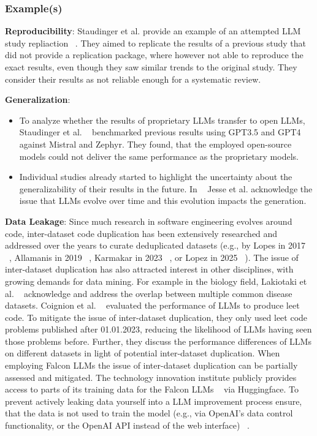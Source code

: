 \begin{itemize}
\subsubsection{Example(s)}
\textbf{Reproducibility}:
Staudinger et al. provide an example of an attempted LLM study repliaction ~\cite{DBLP:conf/sigir-ap/StaudingerKPLH24}. They aimed to replicate the results of a previous study that did not provide a replication package, where however not able to reproduce the exact results, even though they saw similar trends to the original study. They consider their results as not reliable enough for a systematic review.

\textbf{Generalization}:
\begin{itemize}
  \item To analyze whether the results of proprietary LLMs transfer to open LLMs, Staudinger et al. ~\cite{DBLP:conf/sigir-ap/StaudingerKPLH24} benchmarked previous results using GPT3.5 and GPT4 against Mistral and Zephyr. They found, that the employed open-source models could not deliver the same performance as the proprietary models.
  \item Individual studies already started to highlight the uncertainty about the generalizability of their results in the future. In ~\cite{DBLP:conf/msr/JesseADM23} Jesse et al. acknowledge the issue that LLMs evolve over time and this evolution impacts the generation.
\end{itemize}

\textbf{Data Leakage}:
Since much research in software engineering evolves around code, inter-dataset code duplication has been extensively researched and addressed over the years to curate deduplicated datasets (e.g., by Lopes in 2017 ~\cite{DBLP:journals/pacmpl/LopesMMSYZSV17}, Allamanis in 2019 ~\cite{10.1145/3359591.3359735}, Karmakar in 2023 ~\cite{DBLP:journals/ese/KarmakarAR23}, or Lopez in 2025 ~\cite{DBLP:journals/tse/LopezCSSV25}).
The issue of inter-dataset duplication has also attracted interest in other disciplines, with growing demands for data mining. For example in the biology field, Lakiotaki et al. ~\cite{DBLP:journals/biodb/LakiotakiVTGT18} acknowledge and address the overlap between multiple common disease datasets. 
Coignion et al. ~\cite{DBLP:conf/ease/CoignionQR24} evaluated the performance of LLMs to produce leet code. To mitigate the issue of inter-dataset duplication, they only used leet code problems published after 01.01.2023, reducing the likelihood of LLMs having seen those problems before. Further, they discuss the performance differences of LLMs on different datasets in light of potential inter-dataset duplication.
When employing Falcon LLMs the issue of inter-dataset duplication can be partially assessed and mitigated. The technology innovation institute publicly provides access to parts of its training data for the Falcon LLMs ~\cite{technology_innovation_institute_2023} via Huggingface.
To prevent actively leaking data yourself into a LLM improvement process ensure, that the data is not used to train the model (e.g., via OpenAI's data control functionality, or the OpenAI API instead of the web interface) ~\cite{DBLP:conf/eacl/BalloccuSLD24}.


\end{itemize}
